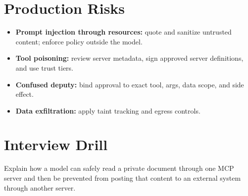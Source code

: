 \section*{Production Risks}
\begin{itemize}
  \item \textbf{Prompt injection through resources:} quote and sanitize untrusted content; enforce policy outside the model.
  \item \textbf{Tool poisoning:} review server metadata, sign approved server definitions, and use trust tiers.
  \item \textbf{Confused deputy:} bind approval to exact tool, args, data scope, and side effect.
  \item \textbf{Data exfiltration:} apply taint tracking and egress controls.
\end{itemize}

\section*{Interview Drill}
Explain how a model can safely read a private document through one MCP server and then be prevented from posting that content to an external system through another server.

